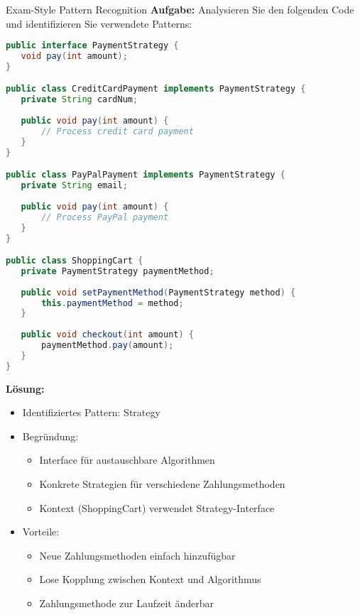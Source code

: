 \begin{example2}{Exam-Style Pattern Recognition}
\textbf{Aufgabe:} Analysieren Sie den folgenden Code und identifizieren Sie verwendete Patterns:

\begin{lstlisting}[language=Java, style=basesmol]
public interface PaymentStrategy {
   void pay(int amount);
}

public class CreditCardPayment implements PaymentStrategy {
   private String cardNum;
   
   public void pay(int amount) {
       // Process credit card payment
   }
}

public class PayPalPayment implements PaymentStrategy {
   private String email;
   
   public void pay(int amount) {
       // Process PayPal payment
   }
}

public class ShoppingCart {
   private PaymentStrategy paymentMethod;
   
   public void setPaymentMethod(PaymentStrategy method) {
       this.paymentMethod = method;
   }
   
   public void checkout(int amount) {
       paymentMethod.pay(amount);
   }
}
\end{lstlisting}

\textbf{Lösung:}
\begin{itemize}
   \item Identifiziertes Pattern: Strategy
   \item Begründung:
   \begin{itemize}
       \item Interface für austauschbare Algorithmen
       \item Konkrete Strategien für verschiedene Zahlungsmethoden
       \item Kontext (ShoppingCart) verwendet Strategy-Interface
   \end{itemize}
   \item Vorteile:
   \begin{itemize}
       \item Neue Zahlungsmethoden einfach hinzufügbar
       \item Lose Kopplung zwischen Kontext und Algorithmus
       \item Zahlungsmethode zur Laufzeit änderbar
   \end{itemize}
\end{itemize}
\end{example2}

\pagebreak

